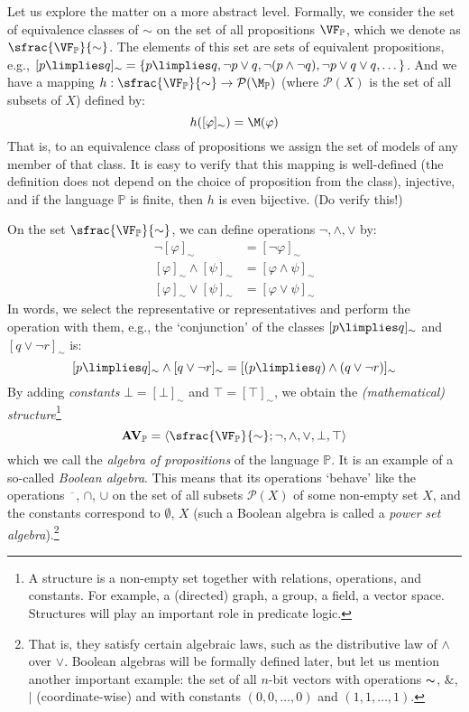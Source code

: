 Let us explore the matter on a more abstract level. Formally, we consider the set of equivalence classes of $\sim$ on the set of all propositions $\VF_\mathbb{P}$, which we denote as $\sfrac{\VF_\mathbb{P}}{\sim}$. The elements of this set are sets of equivalent propositions, e.g., $[p \limplies q]_\sim = \{p \limplies q, \neg p \lor q, \neg(p \land \neg q), \neg p \lor q \lor q, \dots\}$. And we have a mapping $h:\sfrac{\VF_\mathbb{P}}{\sim} \to \mathcal{P}(\M_\mathbb{P})$ (where $\mathcal{P}(X)$ is the set of all subsets of $X$) defined by:
$$
h([\varphi]_\sim) = \M(\varphi)
$$
That is, to an equivalence class of propositions we assign the set of models of any member of that class. It is easy to verify that this mapping is well-defined (the definition does not depend on the choice of proposition from the class), injective, and if the language $\mathbb{P}$ is finite, then $h$ is even bijective. (Do verify this!)

On the set $\sfrac{\VF_\mathbb{P}}{\sim}$, we can define operations $\neg, \land, \lor$ by:
\begin{align*}
    \neg [\varphi]_\sim &= [\neg \varphi]_\sim \\
    [\varphi]_\sim \land [\psi]_\sim &= [\varphi \land \psi]_\sim \\
    [\varphi]_\sim \lor [\psi]_\sim &= [\varphi \lor \psi]_\sim
\end{align*}
In words, we select the representative or representatives and perform the operation with them, e.g., the `conjunction' of the classes $[p \limplies q]_\sim$ and $[q \lor \neg r]_\sim$ is:
$$
[p \limplies q]_\sim \land [q \lor \neg r]_\sim = [(p \limplies q) \land (q \lor \neg r)]_\sim
$$
By adding \emph{constants} $\bot = [\bot]_\sim$ and $\top = [\top]_\sim$, we obtain the \emph{(mathematical) structure}\footnote{A structure is a non-empty set together with relations, operations, and constants. For example, a (directed) graph, a group, a field, a vector space. Structures will play an important role in predicate logic.}
$$
\mathbf{AV}_\mathbb{P} = \langle \sfrac{\VF_\mathbb{P}}{\sim}; \neg, \land, \lor, \bot, \top \rangle
$$
which we call the \emph{algebra of propositions} of the language $\mathbb{P}$. It is an example of a so-called \emph{Boolean algebra}. This means that its operations `behave' like the operations $\overline{\phantom{x}}$, $\cap$, $\cup$ on the set of all subsets $\mathcal{P}(X)$ of some non-empty set $X$, and the constants correspond to $\emptyset$, $X$ (such a Boolean algebra is called a \emph{power set algebra}).\footnote{That is, they satisfy certain algebraic laws, such as the distributive law of $\land$ over $\lor$. Boolean algebras will be formally defined later, but let us mention another important example: the set of all $n$-bit vectors with operations $\thicksim$, $\&$, $|$ (coordinate-wise) and with constants $(0,0,\dots,0)$ and $(1,1,\dots,1)$.}

